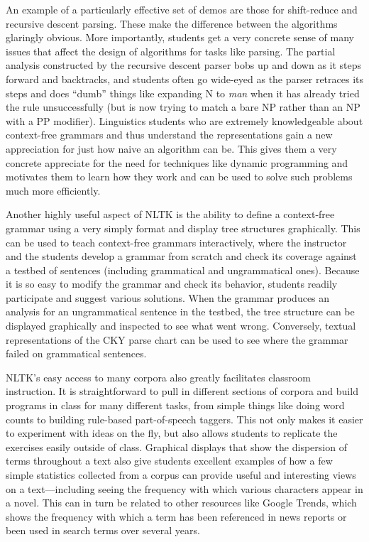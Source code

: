\documentclass[11pt]{article}
\begin{document}
An example of a particularly effective set of demos are those for
shift-reduce and recursive descent parsing. These make the difference
between the algorithms glaringly obvious. More importantly, students
get a very concrete sense of many issues that affect the design of
algorithms for tasks like parsing. The partial analysis constructed by
the recursive descent parser bobs up and down as it steps forward and
backtracks, and students often go wide-eyed as the parser retraces its
steps and does ``dumb'' things like expanding N to {\it man} when it
has already tried the rule unsuccessfully (but is now trying to match
a bare NP rather than an NP with a PP modifier). Linguistics students
who are extremely knowledgeable about context-free grammars and thus
understand the representations gain a new appreciation for just how
naive an algorithm can be. This gives them a very concrete appreciate
for the need for techniques like dynamic programming and motivates
them to learn how they work and can be used to solve such problems
much more efficiently.

Another highly useful aspect of NLTK is the ability to define a
context-free grammar using a very simply format and display tree
structures graphically. This can be used to teach context-free
grammars interactively, where the instructor and the students develop
a grammar from scratch and check its coverage against a testbed of
sentences (including grammatical and ungrammatical ones). Because it
is so easy to modify the grammar and check its behavior, students
readily participate and suggest various solutions. When the grammar
produces an analysis for an ungrammatical sentence in the testbed, the
tree structure can be displayed graphically and inspected to see what
went wrong. Conversely, textual representations of the CKY parse chart
can be used to see where the grammar failed on grammatical sentences.

NLTK's easy access to many corpora also greatly facilitates classroom
instruction. It is straightforward to pull in different sections of
corpora and build programs in class for many different tasks, from
simple things like doing word counts to building rule-based
part-of-speech taggers. This not only makes it easier to experiment
with ideas on the fly, but also allows students to replicate the
exercises easily outside of class. Graphical displays that show the
dispersion of terms throughout a text also give students excellent
examples of how a few simple statistics collected from a corpus can
provide useful and interesting views on a text---including seeing the
frequency with which various characters appear in a novel. This can in
turn be related to other resources like Google Trends, which shows the
frequency with which a term has been referenced in news reports or
been used in search terms over several years.
\end{document}
